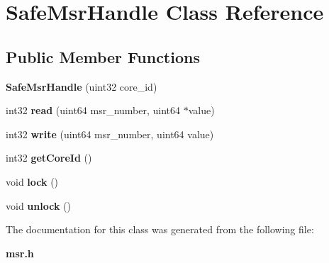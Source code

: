 \section{Safe\+Msr\+Handle Class Reference}
\label{classSafeMsrHandle}
\subsection*{Public Member Functions}
\begin{DoxyCompactItemize}
\item 
\mbox{\label{classSafeMsrHandle_af7a62cd143e86be1ef2d2f6d5f67fc30}} 
{\bfseries Safe\+Msr\+Handle} (uint32 core\+\_\+id)
\item 
\mbox{\label{classSafeMsrHandle_af2ad27203ae5d1072ad8e1ca5d988ce5}} 
int32 {\bfseries read} (uint64 msr\+\_\+number, uint64 $\ast$value)
\item 
\mbox{\label{classSafeMsrHandle_a252aa9dee867d8b8f787b1de007b49a7}} 
int32 {\bfseries write} (uint64 msr\+\_\+number, uint64 value)
\item 
\mbox{\label{classSafeMsrHandle_ae8735531f00abaaa17aac519c1e5360e}} 
int32 {\bfseries get\+Core\+Id} ()
\item 
\mbox{\label{classSafeMsrHandle_a89f1431cde1d9e8ccd12c73cf6646cfd}} 
void {\bfseries lock} ()
\item 
\mbox{\label{classSafeMsrHandle_af88c3d09575dab20ab68ce0267477e31}} 
void {\bfseries unlock} ()
\end{DoxyCompactItemize}


The documentation for this class was generated from the following file\+:\begin{DoxyCompactItemize}
\item 
\textbf{ msr.\+h}\end{DoxyCompactItemize}
